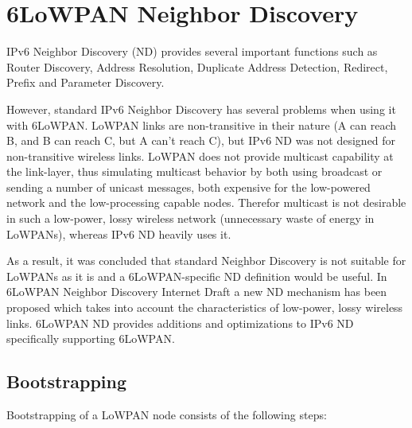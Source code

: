 \documentclass[a4paper,11pt,oneside]{article}
\begin{document}
\section{6LoWPAN Neighbor Discovery}

IPv6 Neighbor Discovery (ND) \cite{rfc4861} provides several important functions such as Router Discovery, Address Resolution, Duplicate Address Detection, Redirect, Prefix and Parameter Discovery.

However, standard IPv6 Neighbor Discovery \cite{rfc4861}  has several problems when using it with 6LoWPAN.
LoWPAN links are non-transitive in their nature (A can reach B, and B can reach C, but A can't reach C), but
IPv6 ND was not designed for non-transitive wireless links. 
LoWPAN does not provide multicast capability at the link-layer, thus simulating multicast behavior by both using broadcast or sending a number of unicast messages, both expensive for the low-powered network and the low-processing capable nodes. Therefor multicast is not desirable in such a low-power, lossy wireless network (unnecessary waste of energy in LoWPANs), whereas IPv6 ND heavily uses it. 

As a result, it was concluded that standard Neighbor Discovery is not suitable for LoWPANs as it is and a 6LoWPAN-specific ND definition would be useful. In 6LoWPAN Neighbor Discovery Internet Draft \cite{draft-nd-06} a new ND mechanism has been proposed which takes into account the characteristics of low-power, lossy wireless links. 6LoWPAN ND provides additions and optimizations to IPv6 ND specifically supporting 6LoWPAN.

\subsection{Bootstrapping}
Bootstrapping of a LoWPAN node consists of the following steps:
\end{document}
